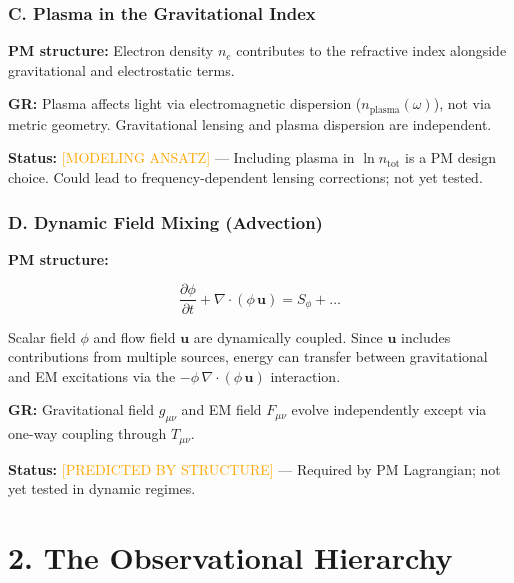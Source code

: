 \documentclass{article}
\begin{document}
\subsubsection*{C. Plasma in the Gravitational Index}

\textbf{PM structure:} Electron density $n_e$ contributes to the refractive
index alongside gravitational and electrostatic terms.

\textbf{GR:} Plasma affects light via electromagnetic dispersion
($n_{\text{plasma}}(\omega)$), not via metric geometry. Gravitational lensing
and plasma dispersion are independent.

\textbf{Status:} \textcolor{orange}{[MODELING ANSATZ]} --- Including plasma in
$\ln n_{\text{tot}}$ is a PM design choice. Could lead to frequency-dependent
lensing corrections; not yet tested.

\subsubsection*{D. Dynamic Field Mixing (Advection)}

\textbf{PM structure:}



\[
\frac{\partial \phi}{\partial t} + \nabla\cdot(\phi\,\mathbf u) = S_\phi + \ldots
\]



Scalar field $\phi$ and flow field $\mathbf u$ are dynamically coupled. Since
$\mathbf u$ includes contributions from multiple sources, energy can transfer
between gravitational and EM excitations via the $-\phi\,\nabla\cdot(\phi\,\mathbf u)$ interaction.

\textbf{GR:} Gravitational field $g_{\mu\nu}$ and EM field $F_{\mu\nu}$ evolve
independently except via one-way coupling through $T_{\mu\nu}$.

\textbf{Status:} \textcolor{orange}{[PREDICTED BY STRUCTURE]} --- Required by PM
Lagrangian; not yet tested in dynamic regimes.

\section*{2. The Observational Hierarchy}
\end{document}
